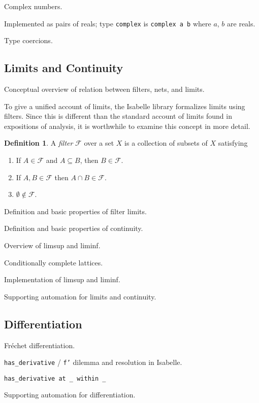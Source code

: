 \documentclass{amsart}
\theoremstyle{definition}
\newtheorem{definition}[theorem]{Definition}
\theoremstyle{remark}
\begin{document}
Complex numbers.

Implemented as pairs of reals; type \texttt{complex} is \texttt{complex a b} where $a$, $b$ are reals.

Type coercions.

\subsection{Limits and Continuity}

Conceptual overview of relation between filters, nets, and limits.

To give a unified account of limits, the Isabelle library formalizes limits using filters. Since this is different than the standard account of limits found in expositions of analysis, it is worthwhile to examine this concept in more detail.

\begin{definition}
A {\em filter} $\mathcal F$ over a set $X$ is a collection of subsets of $X$ satisfying
\begin{enumerate}
\item If $A \in \mathcal F$ and $A \subseteq B$, then $B \in \mathcal F$.
\item If $A, B \in \mathcal F$ then $A \cap B \in \mathcal F$.
\item $\emptyset \notin \mathcal F$.
\end{enumerate}
\end{definition}

Definition and basic properties of filter limits.

Definition and basic properties of continuity.

Overview of limsup and liminf.

Conditionally complete lattices.

Implementation of limsup and liminf.

Supporting automation for limits and continuity.

\subsection{Differentiation}

Fr\'echet differentiation.

\texttt{has\_derivative} / \texttt{f'} dilemma and resolution in Isabelle.

\texttt{has\_derivative at \_ within \_}

Supporting automation for differentiation.
\end{document}
